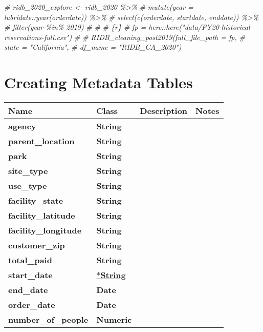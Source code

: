 \documentclass[
]{article}
\newenvironment{Shaded}{\begin{snugshade}}{\end{snugshade}}
\newcommand{\CommentTok}[1]{\textcolor[rgb]{0.56,0.35,0.01}{\textit{#1}}}
\begin{document}
\begin{Shaded}
\begin{Highlighting}[]
\CommentTok{\# ridb\_2020\_explore \textless{}{-} ridb\_2020 \%\textgreater{}\%}
\CommentTok{\#   mutate(year = lubridate::year(orderdate)) \%\textgreater{}\% }
\CommentTok{\#   select(c(orderdate, startdate, enddate)) \%\textgreater{}\% }
\CommentTok{\#   filter(year \%in\% 2019)}
\CommentTok{\# \textasciigrave{}\textasciigrave{}\textasciigrave{}}
\CommentTok{\# }
\CommentTok{\# \textasciigrave{}\textasciigrave{}\textasciigrave{}\{r\}}
\CommentTok{\# fp = here::here("data/FY20{-}historical{-}reservations{-}full.csv")}
\CommentTok{\# }
\CommentTok{\# RIDB\_cleaning\_post2019(full\_file\_path = fp, }
\CommentTok{\#                        state = "California", }
\CommentTok{\#                        df\_name = "RIDB\_CA\_2020")}
\end{Highlighting}
\end{Shaded}

\hypertarget{creating-metadata-tables}{%
\section{Creating Metadata Tables}\label{creating-metadata-tables}}

\begin{longtable}[]{@{}llll@{}}
\toprule
Name & Class & Description & Notes \\
\midrule
\endhead
\textbf{agency} & \textbf{String} & & \\
\textbf{parent\_location} & \textbf{String} & & \\
\textbf{park} & \textbf{String} & & \\
\textbf{site\_type} & \textbf{String} & & \\
\textbf{use\_type} & \textbf{String} & & \\
\textbf{facility\_state} & \textbf{String} & & \\
\textbf{facility\_latitude} & \textbf{String} & & \\
\textbf{facility\_longitude} & \textbf{String} & & \\
\textbf{customer\_zip} & \textbf{String} & & \\
\textbf{total\_paid} & \textbf{String} & & \\
\textbf{start\_date} & \href{string.md}{*\textbf{String}} & & \\
\textbf{end\_date} & \textbf{Date} & & \\
\textbf{order\_date} & \textbf{Date} & & \\
\textbf{number\_of\_people} & \textbf{Numeric} & & \\
\bottomrule
\end{longtable}
\end{document}
